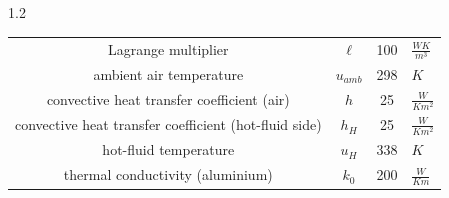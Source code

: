 \documentclass[preview]{standalone}
\begin{document}
\begin{spacing}{1.2}
\begin{tabular}{cccl}
\toprule
Lagrange multiplier & $\ell$ & 100 & $\frac{W K}{m^3}$ \\ 
ambient air temperature & $u_{amb}$ & 298 & $K$ \\ 
convective heat transfer coefficient (air) & $h$ & 25 & $\frac{W}{K m^2}$ \\ 
convective heat transfer coefficient (hot-fluid side) & $h_{H}$ & 25 & $\frac{W}{K m^2}$ \\ 
hot-fluid temperature & $u_{H}$ & 338 & $K$ \\ 
thermal conductivity (aluminium) & $k_{0}$ & 200 & $\frac{W}{K m}$ \\ 
\bottomrule
\end{tabular}
\end{spacing}
\end{document}
